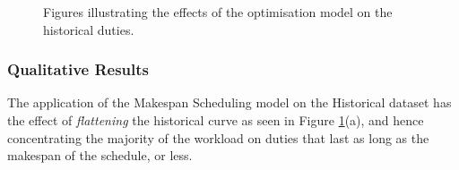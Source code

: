 \begin{figure}%
    \centering
    \qquad
    \centering
    \caption{Figures illustrating the effects of the optimisation model on the historical duties.}%
    \label{fig:1-D1M1}%
\end{figure}


\subsubsection*{Qualitative Results}
The application of the Makespan Scheduling model on the Historical dataset has the effect of \textit{flattening} the historical curve as seen in Figure \ref{fig:1-D1M1}(a), and hence concentrating the majority of the workload on duties that last as long as the makespan of the schedule, or less. 

